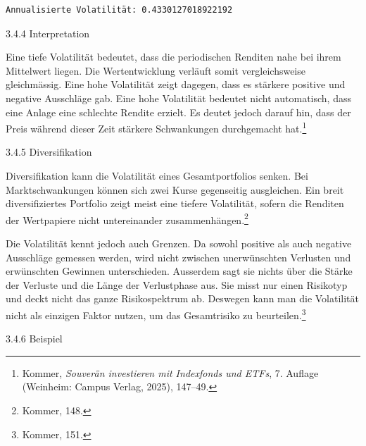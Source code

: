 \documentclass[
  ngerman,
  a4paper,
  DIV=11,
  oneside]{scrreprt}
\begin{document}
\begin{verbatim}
Annualisierte Volatilität: 0.4330127018922192
\end{verbatim}

3.4.4 Interpretation

Eine tiefe Volatilität bedeutet, dass die periodischen Renditen nahe bei
ihrem Mittelwert liegen. Die Wertentwicklung verläuft somit
vergleichsweise gleichmässig. Eine hohe Volatilität zeigt dagegen, dass
es stärkere positive und negative Ausschläge gab. Eine hohe Volatilität
bedeutet nicht automatisch, dass eine Anlage eine schlechte Rendite
erzielt. Es deutet jedoch darauf hin, dass der Preis während dieser Zeit
stärkere Schwankungen durchgemacht hat.\footnote{Kommer, \emph{Souverän
  investieren mit Indexfonds und ETFs}, 7. Auflage (Weinheim: Campus
  Verlag, 2025), 147--49.}

3.4.5 Diversifikation

Diversifikation kann die Volatilität eines Gesamtportfolios senken. Bei
Marktschwankungen können sich zwei Kurse gegenseitig ausgleichen. Ein
breit diversifiziertes Portfolio zeigt meist eine tiefere Volatilität,
sofern die Renditen der Wertpapiere nicht untereinander
zusammenhängen.\footnote{Kommer, 148.}

Die Volatilität kennt jedoch auch Grenzen. Da sowohl positive als auch
negative Ausschläge gemessen werden, wird nicht zwischen unerwünschten
Verlusten und erwünschten Gewinnen unterschieden. Ausserdem sagt sie
nichts über die Stärke der Verluste und die Länge der Verlustphase aus.
Sie misst nur einen Risikotyp und deckt nicht das ganze Risikospektrum
ab. Deswegen kann man die Volatilität nicht als einzigen Faktor nutzen,
um das Gesamtrisiko zu beurteilen.\footnote{Kommer, 151.}

3.4.6 Beispiel
\end{document}
